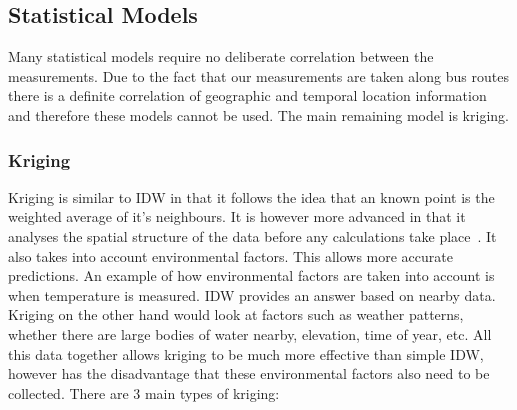 \subsection{Statistical Models}\label{statisticalmodels}

Many statistical models require no deliberate correlation between the measurements. Due to the fact that our measurements are taken along bus routes there is a definite correlation of geographic and temporal location information and therefore these models cannot be used. The main remaining model is kriging.

\subsubsection{Kriging}

Kriging is similar to IDW in that it follows the idea that an known point is the weighted average of it's neighbours. It is however more advanced in that it analyses the spatial structure of the data before any calculations take place~\cite{geostatisticalradiomapping}. It also takes into account environmental factors. This allows more accurate predictions. An example of how environmental factors are taken into account is when temperature is measured. IDW provides an answer based on nearby data. Kriging on the other hand would look at factors such as weather patterns, whether there are large bodies of water nearby, elevation, time of year, etc. All this data together allows kriging to be much more effective than simple IDW, however has the disadvantage that these environmental factors also need to be collected. There are 3 main types of kriging:

